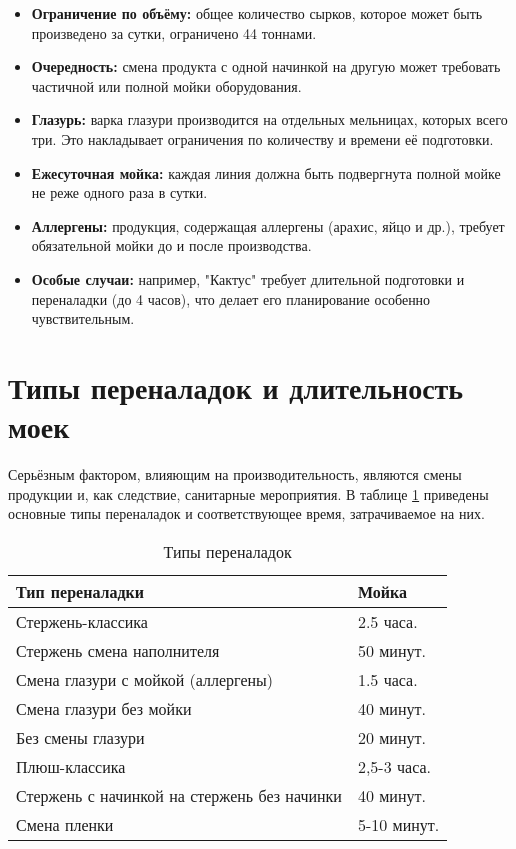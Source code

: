 \begin{itemize}
  \item \textbf{Ограничение по объёму:} общее количество сырков, которое может быть произведено за сутки, ограничено 44 тоннами.
  \item \textbf{Очередность:} смена продукта с одной начинкой на другую может требовать частичной или полной мойки оборудования.
  \item \textbf{Глазурь:} варка глазури производится на отдельных мельницах, которых всего три. Это накладывает ограничения по количеству и времени её подготовки.
  \item \textbf{Ежесуточная мойка:} каждая линия должна быть подвергнута полной мойке не реже одного раза в сутки.
  \item \textbf{Аллергены:} продукция, содержащая аллергены (арахис, яйцо и др.), требует обязательной мойки до и после производства.
  \item \textbf{Особые случаи:} например, "Кактус" требует длительной подготовки и переналадки (до 4 часов), что делает его планирование особенно чувствительным.
\end{itemize}

\section{Типы переналадок и длительность моек}

Серьёзным фактором, влияющим на производительность, являются смены продукции и, как следствие, санитарные мероприятия. В таблице \ref{table:CleaningTimeBetweenProducts} приведены основные типы переналадок и соответствующее время, затрачиваемое на них.

\begin{table}[h]
\centering
\caption{Типы переналадок}
\begin{tabularx}{\textwidth}{|l|X|}
\hline
\textbf{Тип переналадки} & \textbf{Мойка} \\
\hline
Стержень-классика                                                    & 2.5 часа. \\
\hline
Стержень смена наполнителя                                           & 50 минут. \\
\hline
Смена глазури с мойкой (аллергены)                                   & 1.5 часа. \\
\hline
Смена глазури без мойки                                              & 40 минут. \\
\hline
Без смены глазури                                                    & 20 минут. \\
\hline
Плюш-классика                                                        &  2,5-3 часа.\\
\hline
Стержень с начинкой на стержень без начинки                          & 40 минут. \\
\hline
Смена пленки                                                         & 5-10 минут. \\
\hline
\end{tabularx}
\label{table:CleaningTimeBetweenProducts}
\end{table}

